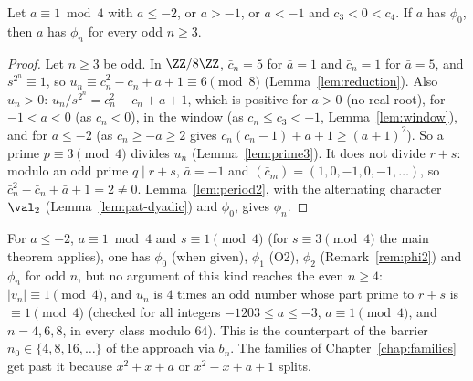 \begin{corollary}
  \label{cor:odd}
  \leanok
  Let $a \equiv 1 \bmod 4$ with $a \le -2$, or $a > -1$, or $a < -1$ and $c_3 < 0 < c_4$. If $a$
  has $\phi_0$, then $a$ has $\phi_n$ for every odd $n \ge 3$.
\end{corollary}
\begin{proof}
  \leanok
  Let $n \ge 3$ be odd. In $\ZZ/8\ZZ$, $\bar c_n = 5$ for $\bar a = 1$ and $\bar c_n = 1$ for
  $\bar a = 5$, and $s^{2^n} \equiv 1$, so $u_n \equiv \bar c_n^2 - \bar c_n + \bar a + 1 \equiv 6
  \pmod 8$ (Lemma~\ref{lem:reduction}). Also $u_n > 0$: $u_n / s^{2^n} = c_n^2 - c_n + a + 1$, which is
  positive for $a > 0$ (no real root), for $-1 < a < 0$ (as $c_n < 0$), in the window (as
  $c_n \le c_3 < -1$, Lemma~\ref{lem:window}), and for $a \le -2$ (as $c_n \ge -a \ge 2$ gives
  $c_n(c_n - 1) + a + 1 \ge (a + 1)^2$). So a prime $p \equiv 3 \pmod 4$ divides $u_n$
  (Lemma~\ref{lem:prime3}). It does not divide $r + s$: modulo an odd prime $q \mid r + s$,
  $\bar a = -1$ and $(\bar c_m) = (1, 0, -1, 0, -1, \dots)$, so
  $\bar c_n^2 - \bar c_n + \bar a + 1 = 2 \ne 0$. Lemma~\ref{lem:period2}, with the alternating
  character $\val_2$ (Lemma~\ref{lem:pat-dyadic}) and $\phi_0$, gives $\phi_n$.
\end{proof}

\begin{remark}
  \label{rem:even}
  For $a \le -2$, $a \equiv 1 \bmod 4$ and $s \equiv 1 \pmod 4$ (for $s \equiv 3 \pmod 4$ the
  main theorem applies), one has $\phi_0$ (when given), $\phi_1$ (O2), $\phi_2$
  (Remark~\ref{rem:phi2}) and $\phi_n$ for odd $n$, but no argument of this kind reaches the
  even $n \ge 4$: $|v_n| \equiv 1 \pmod 4$, and $u_n$ is $4$ times an odd number whose part prime
  to $r + s$ is $\equiv 1 \pmod 4$ (checked for all integers $-1203 \le a \le -3$,
  $a \equiv 1 \pmod 4$, and $n = 4, 6, 8$, in every class modulo $64$). This is the counterpart of
  the barrier $n_0 \in \{4, 8, 16, \dots\}$ of the approach via $b_n$. The families of
  Chapter~\ref{chap:families} get past it because $x^2 + x + a$ or $x^2 - x + a + 1$ splits.
\end{remark}
